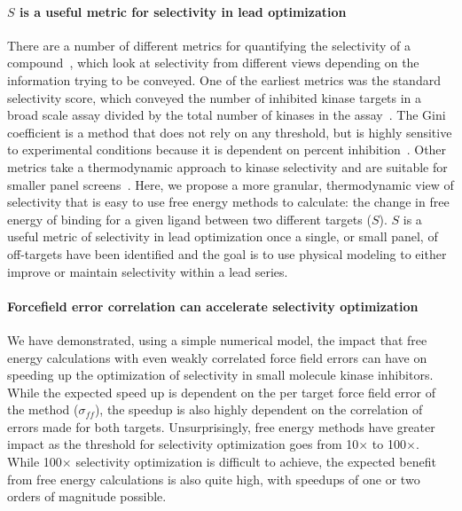 \documentclass[phd,tocprelim]{cornell}
\begin{document}
\paragraph{$S$ is a useful metric for selectivity in lead optimization}
There are a number of different metrics for quantifying the selectivity of a compound~\citep{Bosc:2017gs}, which look at selectivity from different views depending on the information trying to be conveyed. 
One of the earliest metrics was the standard selectivity score, which conveyed the number of inhibited kinase targets in a broad scale assay divided by the total number of kinases in the assay~\citep{Davis2011-dz}. 
The Gini coefficient is a method that does not rely on any threshold, but is highly sensitive to experimental conditions because it is dependent on percent inhibition~\citep{Graczyk:2007bm}. Other metrics take a thermodynamic approach to kinase selectivity and are suitable for smaller panel screens~\citep{DuongLy:2016iha,Uitdehaag:2011ea}. Here, we propose a more granular, thermodynamic  view of selectivity that is easy to use free energy methods to calculate: the change in free energy of binding for a given ligand between two different targets ($S$). 
$S$ is a useful metric of selectivity in lead optimization once a single, or small panel, of off-targets have been identified and the goal is to use physical modeling to either improve or maintain selectivity within a lead series. 

\paragraph{Forcefield error correlation can accelerate selectivity optimization}
We have demonstrated, using a simple numerical model, the impact that free energy calculations with even weakly correlated force field errors can have on speeding up the optimization of selectivity in small molecule kinase inhibitors. 
While the expected speed up is dependent on the per target force field error of the method ($\sigma_{ff}$), the speedup is also highly dependent on the correlation of errors made for both targets. 
Unsurprisingly, free energy methods have greater impact as the threshold for selectivity optimization goes from 10$\times$ to 100$\times$. 
While 100$\times$ selectivity optimization is difficult to achieve, the expected benefit from free energy calculations is also quite high, with speedups of one or two orders of magnitude possible. 
\end{document}
